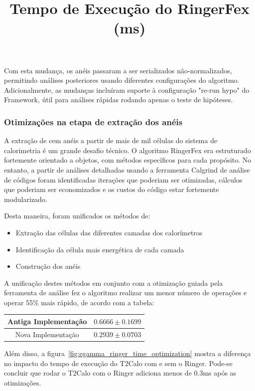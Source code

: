 \documentclass[a4paper,10pt,titlepage]{article}
\begin{document}
Com esta mudança, os anéis passaram a ser serializados não-normalizados, permitindo análises posteriores usando diferentes configurações do algoritmo.
Adicionalmente, as mudanças incluíram suporte à configuração "re-run hypo" do Framework, útil para análises rápidas rodando apenas o teste de hipóteses.

\subsubsection{Otimizações na etapa de extração dos anéis}

A extração de cem anéis a partir de mais de mil células do sistema de calorimetria é um grande desafio técnico.
O algoritmo RingerFex era estruturado fortemente orientado a objetos, com métodos específicos para cada propósito.
No entanto, a partir de análises detalhadas usando a ferramenta Calgrind de análise de códigos foram identificadas iterações que poderiam ser otimizadas, cálculos que poderiam ser economizados e os custos do código estar fortemente modularizado.

Desta maneira, foram unificados os métodos de:
\begin{itemize}
 \item Extração das células das diferentes camadas dos calorímetros
 \item Identificação da célula mais energética de cada camada
 \item Construção dos anéis
\end{itemize}

A unificação destes métodos em conjunto com a otimização guiada pela ferramenta de análise fez o algoritmo realizar um menor número de operações e operar 55\% mais rápido, de acordo com a tabela:

\begin{table}[htbp!]
 \centering
 \title{\textbf{Tempo de Execução do RingerFex (ms)}}
 \begin{tabular}{cc}
  \hline Antiga Implementação & $ 0.6666 \pm 0.1699 $\\
  \hline Nova Implementação & $ 0.2939 \pm 0.0703 $\\
 \end{tabular}
\end{table}

Além disso, a figura~\ref{fig:egamma_ringer_time_optimization} mostra a diferença no impacto do tempo de execução do T2Calo com e sem o Ringer.
Pode-se concluir que rodar o T2Calo com o Ringer adiciona menos de 0.3ms após as otimizações.
\end{document}
